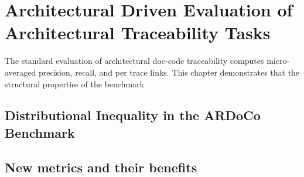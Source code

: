 \section{Architectural Driven Evaluation of Architectural Traceability Tasks}
The standard evaluation of architectural doc-code traceability computes micro-averaged precision, recall, and \fone per trace links.
This chapter demonstrates that the structural properties of the benchmark
\subsection{Distributional Inequality in the ARDoCo Benchmark}
\subsection{New metrics and their benefits}